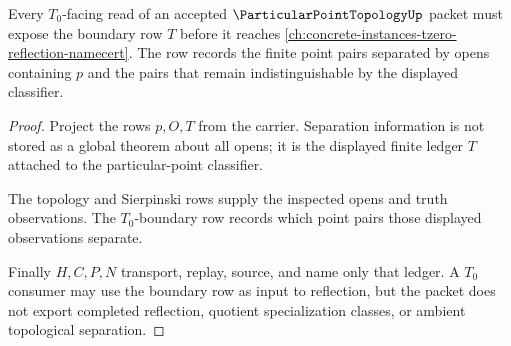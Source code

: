 \begin{theorem}
\label{thm:particular-point-topology-tzero-boundary}
Every $T_0$-facing read of an accepted $\ParticularPointTopologyUp$ packet must expose the boundary row $T$ before it reaches \autoref{ch:concrete-instances-tzero-reflection-namecert}. The row records the finite point pairs separated by opens containing $p$ and the pairs that remain indistinguishable by the displayed classifier.
\end{theorem}
\begin{proof}
Project the rows $p,O,T$ from the carrier. Separation information is not stored as a global theorem about all opens; it is the displayed finite ledger $T$ attached to the particular-point classifier.

The topology and Sierpinski rows supply the inspected opens and truth observations. The $T_0$-boundary row records which point pairs those displayed observations separate.

Finally $H,C,P,N$ transport, replay, source, and name only that ledger. A $T_0$ consumer may use the boundary row as input to reflection, but the packet does not export completed reflection, quotient specialization classes, or ambient topological separation.
\end{proof}


\begin{closurestatus}{\ParticularPointTopologyUp}
  \theoryclosure{\seedClosure}
  \formalstatus{\unformalizedV}
\end{closurestatus}
